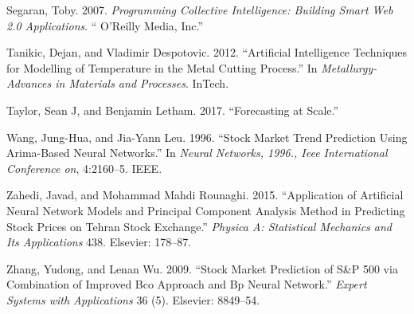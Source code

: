 \documentclass[12pt,a4paper]{article}
\numberwithin{equation}{section}
\numberwithin{figure}{section}
\numberwithin{table}{section}
\renewcommand{\baselinestretch}{1.5}
\begin{document}
\hypertarget{ref-segaran2007programming}{}
Segaran, Toby. 2007. \emph{Programming Collective Intelligence: Building
Smart Web 2.0 Applications}. `` O'Reilly Media, Inc.''

\hypertarget{ref-tanikic2012artificial}{}
Tanikic, Dejan, and Vladimir Despotovic. 2012. ``Artificial Intelligence
Techniques for Modelling of Temperature in the Metal Cutting Process.''
In \emph{Metallurgy-Advances in Materials and Processes}. InTech.

\hypertarget{ref-taylor2017forecasting}{}
Taylor, Sean J, and Benjamin Letham. 2017. ``Forecasting at Scale.''

\hypertarget{ref-wang1996stock}{}
Wang, Jung-Hua, and Jia-Yann Leu. 1996. ``Stock Market Trend Prediction
Using Arima-Based Neural Networks.'' In \emph{Neural Networks, 1996.,
Ieee International Conference on}, 4:2160--5. IEEE.

\hypertarget{ref-zahedi2015application}{}
Zahedi, Javad, and Mohammad Mahdi Rounaghi. 2015. ``Application of
Artificial Neural Network Models and Principal Component Analysis Method
in Predicting Stock Prices on Tehran Stock Exchange.'' \emph{Physica A:
Statistical Mechanics and Its Applications} 438. Elsevier: 178--87.

\hypertarget{ref-zhang2009stock}{}
Zhang, Yudong, and Lenan Wu. 2009. ``Stock Market Prediction of S\&P 500
via Combination of Improved Bco Approach and Bp Neural Network.''
\emph{Expert Systems with Applications} 36 (5). Elsevier: 8849--54.

\newpage
\renewcommand{\baselinestretch}{1}
\nocite{*}

\end{document}
